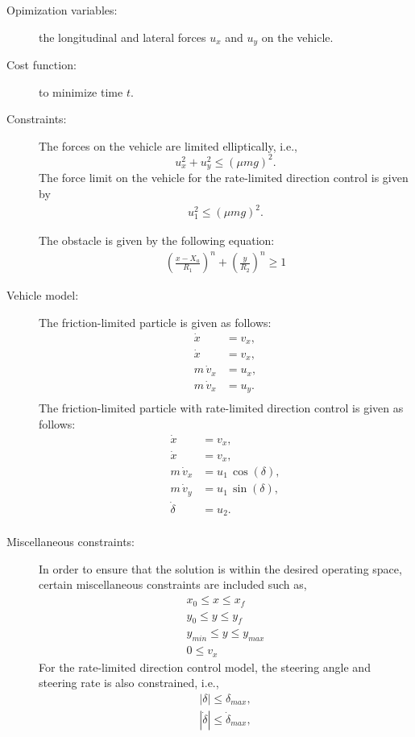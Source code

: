\begin{description}
    \item[Opimization variables:] the longitudinal and lateral forces $u_x$ and $u_y$ on the vehicle. 
    \item[Cost function:] to minimize time $t$.
    \item[Constraints:] The forces on the vehicle are limited elliptically, i.e., \begin{equation*}
        u_x^2 + u_y^2 \leq (\mu m g)^2.
    \end{equation*}
    The force limit on the vehicle for the rate-limited direction control is given by \begin{align*}
        u_1^2 \leq (\mu m g)^2.
    \end{align*}\par The obstacle is given by the following equation:
    \begin{align*}
        \left(\frac{x - X_a}{R_1}\right)^n + \left(\frac{y}{R_2}\right)^n \geq 1
    \end{align*}
    \item[Vehicle model:] The friction-limited particle is given as follows: \begin{align*}
        \dot x &= v_x, \\
        \dot x &= v_x, \\
        m\,\dot v_x &= u_x,\\
        m\,\dot v_x &= u_y. \\
    \end{align*}
    The friction-limited particle with rate-limited direction control is given as follows: \begin{align*}
        \dot x &= v_x, \\
        \dot x &= v_x, \\
        m\,\dot v_x &= u_1\,\cos\left(\delta\right),\\
        m\,\dot v_y &= u_1\,\sin\left(\delta\right), \\
        \dot \delta &= u_2. \\
    \end{align*}
    \item[Miscellaneous constraints:] In order to ensure that the solution is within the desired operating space, certain miscellaneous constraints are included such as, \begin{align*}
        x_0 \leq x \leq x_f\\
        y_0 \leq y \leq y_f\\
        y_{min} \leq y \leq y_{max} \\
        0 \leq v_x 
    \end{align*} 
    For the rate-limited direction control model, the steering angle and steering rate is also constrained, i.e., \begin{align*}
        |\delta| \leq \delta_{max}, \\
        |\dot\delta| \leq \dot\delta_{max}, \\
    \end{align*}
\end{description}

